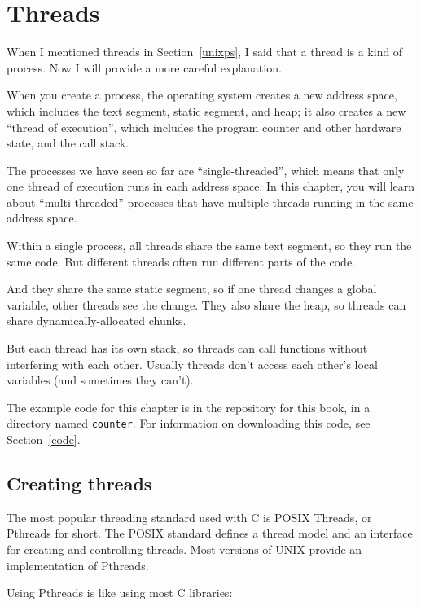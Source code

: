 \documentclass[12pt]{book}
\begin{document}
{%


\chapter{Threads}

When I mentioned threads in Section~\ref{unixps}, I said that a thread
is a kind of process.  Now I will provide a more careful explanation.

When you create a process, the operating system creates a new address
space, which includes the text segment, static segment, and heap; it
also creates a new ``thread of execution'', which includes the program
counter and other hardware state, and the call stack.

The processes we have seen so far are ``single-threaded'', which means
that only one thread of execution runs in each address space.  In this
chapter, you will learn about ``multi-threaded'' processes that have
multiple threads running in the same address space.

Within a single process, all threads share the same text segment, so
they run the same code.  But different threads often run different parts
of the code.

And they share the same static segment, so if one thread changes a
global variable, other threads see the change.  They also share the heap,
so threads can share dynamically-allocated chunks.

But each thread has its own stack, so threads can call functions without
interfering with each other.  Usually threads don't access each
other's local variables (and sometimes they can't).

The example code for this chapter is in the repository for this book,
in a directory named {\tt counter}.  For information on downloading
this code, see Section~\ref{code}.


\section{Creating threads}

The most popular threading standard used with C is POSIX Threads, or Pthreads for short.  The POSIX standard defines a thread model and an interface for creating and controlling threads.  Most versions of UNIX provide an implementation of Pthreads.

Using Pthreads is like using most C libraries:

\begin{itemize}


\end{itemize}}
\end{document}
